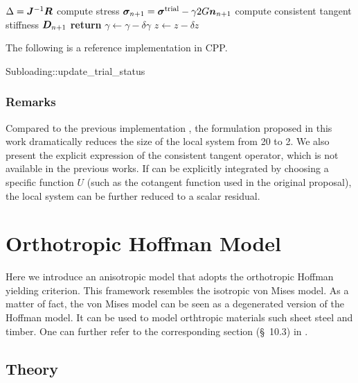 \begin{breakablealgorithm}
\begin{algorithmic}[1]
        \State $\Delta=\bm{J}^{-1}\bm{R}$
        \State compute stress $\bm{\sigma}_{n+1}=\bm{\sigma}^\text{trial}-\gamma2G\bm{n}_{n+1}$
        \State compute consistent tangent stiffness $\bm{D}_{n+1}$
        \State \textbf{return}
        \EndIf
        \State $\gamma\leftarrow\gamma-\delta\gamma$
        \State $z\leftarrow{}z-\delta{}z$
        \EndWhile
    \end{algorithmic}
\end{breakablealgorithm}

The following is a reference implementation in CPP.
\begin{cppcode}
Subloading::update_trial_status
\end{cppcode}
\subsubsection{Remarks}
Compared to the previous implementation \cite{Fincato2017,Anjiki2019}, the formulation proposed in this work dramatically reduces the size of the local system from \num{20} to \num{2}.
We also present the explicit expression of the consistent tangent operator, which is not available in the previous works.
If  can be explicitly integrated by choosing a specific function $U$ (such as the cotangent function used in the original proposal), the local system can be further reduced to a scalar residual.
\section{Orthotropic Hoffman Model}\label{sec:hoffman}
Here we introduce an anisotropic model that adopts the orthotropic Hoffman yielding criterion.
This framework resembles the isotropic von Mises model.
As a matter of fact, the von Mises model can be seen as a degenerated version of the Hoffman model.
It can be used to model orthtropic materials such sheet steel and timber.
One can further refer to the corresponding section (\S~10.3) in \cite{SouzaNeto2008}.
\subsection{Theory}
